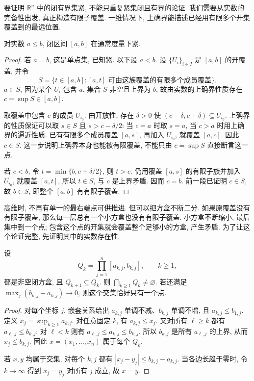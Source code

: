 \label{ch:eucompact:boxes}

要证明 $\mathbb{R}^n$ 中的闭有界集紧, 不能只重复紧集闭且有界的论证. 我们需要从实数的完备性出发, 真正构造有限子覆盖. 一维情况下, 上确界能描述已经用有限多个开集覆盖到的最远位置.

\begin{theorem}[闭区间的紧性]
\label{ch:eucompact:interval}
对实数 $a\leq b$, 闭区间 $[a,b]$ 在通常度量下紧.
\end{theorem}
\begin{proof}
若 $a=b$, 这是单点集, 已知紧. 以下设 $a<b$. 设 $\{U_i\}_{i\in I}$ 是 $[a,b]$ 的开覆盖, 并令
\[
 S=\{t\in[a,b]:[a,t]\text{ 可由这族覆盖的有限多个成员覆盖}\}.
\]
$a\in S$, 因为某个 $U_i$ 包含 $a$. 集合 $S$ 非空且上界为 $b$, 故由实数的上确界性质存在 $c=\sup S\in[a,b]$.

取覆盖中包含 $c$ 的成员 $U_{i_0}$. 由开放性, 存在 $\delta>0$ 使 $(c-\delta,c+\delta)\subseteq U_{i_0}$. 上确界的性质保证可以取 $s\in S$ 且 $s>c-\delta/2$: 当 $c=a$ 时取 $s=a$, 当 $c>a$ 时用上确界的逼近性质. 已有有限多个成员覆盖 $[a,s]$, 再加入 $U_{i_0}$, 就覆盖 $[a,c]$. 因此 $c\in S$. 这一步说明上确界本身也能被有限覆盖, 不能只由 $c=\sup S$ 直接断言这一点.

若 $c<b$, 令 $t=\min\{b,c+\delta/2\}$, 则 $t>c$. 仍用覆盖 $[a,s]$ 的有限子族并加入 $U_{i_0}$, 就覆盖 $[a,t]$, 所以 $t\in S$, 与 $c$ 是上界矛盾. 因而 $c=b$. 前一段已证明 $c\in S$, 故 $b\in S$, 即整个 $[a,b]$ 有有限子覆盖.
\end{proof}

高维时, 不再有单一的最右端点可供推进. 但可以把方盒不断二分. 如果原覆盖没有有限子覆盖, 那么每一层总有一个小方盒也没有有限子覆盖. 小方盒不断缩小, 最后集中到一个点; 包含这个点的开集就会覆盖整个足够小的方盒, 产生矛盾. 为了让这个论证完整, 先证明其中的实数存在性.

\begin{lemma}[嵌套方盒]
\label{ch:eucompact:nested-boxes}
设
\[
 Q_k=\prod_{j=1}^n[a_{k,j},b_{k,j}],\qquad k\geq1,
\]
都是非空闭方盒, 且 $Q_{k+1}\subseteq Q_k$. 则 $\bigcap_{k\geq1}Q_k\ne\varnothing$. 若还满足
$\max_j(b_{k,j}-a_{k,j})\to0$, 则这个交集恰好只有一个点.
\end{lemma}
\begin{proof}
对每个坐标 $j$, 嵌套关系给出 $a_{k,j}$ 单调不减、$b_{k,j}$ 单调不增, 且 $a_{k,j}\leq b_{1,j}$. 定义 $x_j=\sup_{k\geq1}a_{k,j}$. 对任意固定 $k$, 有 $a_{k,j}\leq x_j$. 又对所有 $\ell\geq k$ 都有 $a_{\ell,j}\leq b_{k,j}$; 对 $\ell<k$ 则有 $a_{\ell,j}\leq a_{k,j}\leq b_{k,j}$. 所以 $b_{k,j}$ 是所有 $a_{\ell,j}$ 的上界, 从而 $x_j\leq b_{k,j}$. 因此 $x=(x_1,\ldots,x_n)$ 属于每个 $Q_k$.

若 $x,y$ 均属于交集, 对每个 $k,j$ 都有 $|x_j-y_j|\leq b_{k,j}-a_{k,j}$. 当各边长趋于零时, 令 $k\to\infty$ 得到 $x_j=y_j$ 对所有 $j$ 成立, 故 $x=y$.
\end{proof}

